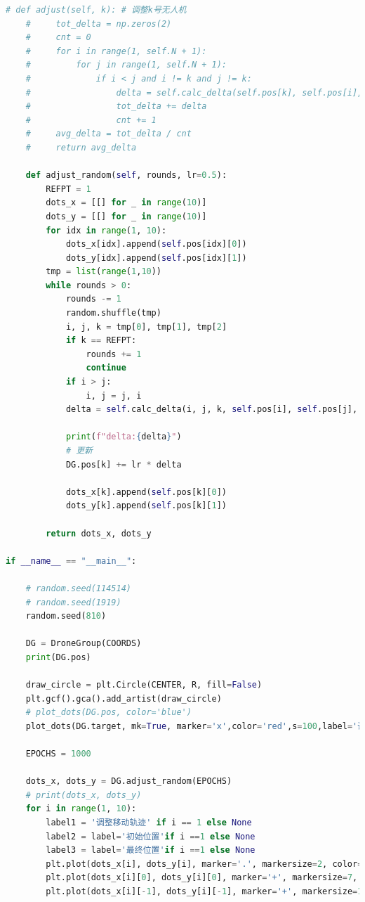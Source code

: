 \documentclass[withoutpreface,bwprint]{cumcmthesis} %
\begin{document}
\begin{appendices}
\begin{lstlisting}[language=python]
    # def adjust(self, k): # 调整k号无人机
    #     tot_delta = np.zeros(2)
    #     cnt = 0
    #     for i in range(1, self.N + 1):
    #         for j in range(1, self.N + 1):
    #             if i < j and i != k and j != k:
    #                 delta = self.calc_delta(self.pos[k], self.pos[i], self.pos[j])
    #                 tot_delta += delta
    #                 cnt += 1
    #     avg_delta = tot_delta / cnt
    #     return avg_delta
    
    def adjust_random(self, rounds, lr=0.5):
        REFPT = 1
        dots_x = [[] for _ in range(10)]
        dots_y = [[] for _ in range(10)]
        for idx in range(1, 10):
            dots_x[idx].append(self.pos[idx][0])
            dots_y[idx].append(self.pos[idx][1])
        tmp = list(range(1,10))
        while rounds > 0:
            rounds -= 1
            random.shuffle(tmp)
            i, j, k = tmp[0], tmp[1], tmp[2]
            if k == REFPT:
                rounds += 1
                continue
            if i > j:
                i, j = j, i
            delta = self.calc_delta(i, j, k, self.pos[i], self.pos[j], debug=True)
            
            print(f"delta:{delta}")
            # 更新
            DG.pos[k] += lr * delta
            
            dots_x[k].append(self.pos[k][0])
            dots_y[k].append(self.pos[k][1])
        
        return dots_x, dots_y
            
if __name__ == "__main__":
    
    # random.seed(114514)
    # random.seed(1919)
    random.seed(810)
    
    DG = DroneGroup(COORDS)
    print(DG.pos)
    
    draw_circle = plt.Circle(CENTER, R, fill=False)
    plt.gcf().gca().add_artist(draw_circle)
    # plot_dots(DG.pos, color='blue')
    plot_dots(DG.target, mk=True, marker='x',color='red',s=100,label='调整目标')
    
    EPOCHS = 1000
    
    dots_x, dots_y = DG.adjust_random(EPOCHS)
    # print(dots_x, dots_y)
    for i in range(1, 10):
        label1 = '调整移动轨迹' if i == 1 else None 
        label2 = label='初始位置'if i ==1 else None
        label3 = label='最终位置'if i ==1 else None
        plt.plot(dots_x[i], dots_y[i], marker='.', markersize=2, color='blue', label=label1)
        plt.plot(dots_x[i][0], dots_y[i][0], marker='+', markersize=7, color='orange', label=label2)
        plt.plot(dots_x[i][-1], dots_y[i][-1], marker='+', markersize=10, color='cyan', label=label3)
        

\end{lstlisting}
\end{appendices}
\end{document}
